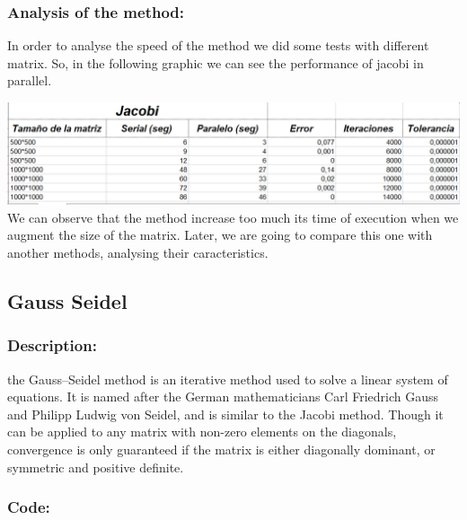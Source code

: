 \documentclass{article}
\begin{document}
\subsubsection{Analysis of the method:}

In order to analyse the speed of the method we did some tests with different matrix. So, in the following graphic we can see the performance of jacobi in parallel.

\includegraphics[width=\linewidth]{./images/jacobi.png}\\

We can observe that the method increase too much its time of execution when we augment the size of the matrix. Later, we are going to compare this one with another methods, analysing their caracteristics.

\newpage

\subsection{Gauss Seidel}

\subsubsection{Description:}
 the Gauss–Seidel method is an iterative method used to solve a linear system of equations. It is named after the German mathematicians Carl Friedrich Gauss and Philipp Ludwig von Seidel, and is similar to the Jacobi method. Though it can be applied to any matrix with non-zero elements on the diagonals, convergence is only guaranteed if the matrix is either diagonally dominant, or symmetric and positive definite.

\subsubsection{Code:}
\end{document}
